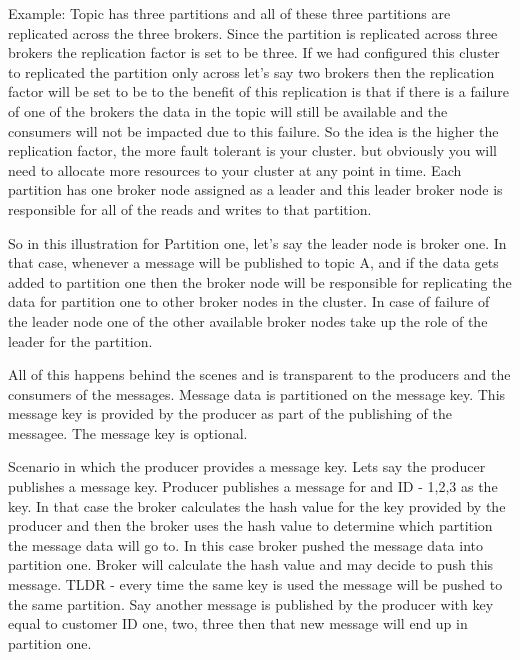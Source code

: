 Example:
Topic has three partitions and all of these three partitions are replicated across the three brokers.
Since the partition is replicated across three brokers the replication factor is set to be three.
If we had configured this cluster to replicated the partition only across let's say two brokers then the replication factor will be set to be to the benefit of this replication is that if there is a failure of one of the brokers the data in the topic will still be available and the consumers will not be impacted due to this failure.
So the idea is the higher the replication factor, the more fault tolerant is your cluster.
but obviously you will need to allocate more resources to your cluster at any point in time.
Each partition has one broker node assigned as a leader and this leader broker node is responsible for all of the reads and writes to that partition.

So in this illustration for Partition one, let's say the leader node is broker one.
In that case, whenever a message will be published to topic A, and if the data gets added to partition one then the broker node will be responsible for replicating
the data for partition one to other broker nodes in the cluster.
In case of failure of the leader node one of the other available broker nodes take up the role of the leader for the partition.

All of this happens behind the scenes and is transparent to the producers and the consumers of the messages.
Message data is partitioned on the message key.
This message key is provided by the producer as part of the publishing of the messagee.
The message key is optional.

Scenario in which the producer provides a message key.
Lets say the producer publishes a message key.
Producer publishes a message for and ID - 1,2,3 as the key.
In that case the broker calculates the hash value for the key provided by the producer and then the broker uses the hash value to determine which partition the message data will go to.
In this case broker pushed the message data into partition one.
Broker will calculate the hash value and may decide to push this message.
TLDR - every time the same key is used the message will be pushed to the same partition.
Say another message is published by the producer with key equal to customer ID one, two, three then that new message will end up in partition one.

